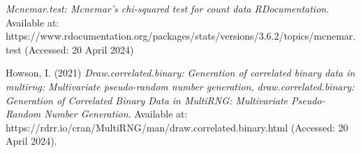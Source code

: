 \documentclass[12pt, letterpaper]{article}
\theoremstyle{definition}
\numberwithin{equation}{section}
\newcommand{\+}[1]{+_{\scalebox{.375}{#1}}}
\newcommand{\1}{\mathbbm{1}}
\begin{document}
\newpage\label{section.references}
\begin{thebibliography}{100}
	 \textit{Mcnemar.test: Mcnemar’s chi-squared test for count data RDocumentation}. Available at: https://www.rdocumentation.org/packages/stats/versions/3.6.2/topics/mcnemar.test (Accessed: 20 April 2024)
	
	 Howson, I. (2021) \textit{Draw.correlated.binary: Generation of correlated binary data in multirng: Multivariate pseudo-random number generation, draw.correlated.binary: Generation of Correlated Binary Data in MultiRNG: Multivariate Pseudo-Random Number Generation}. Available at: https://rdrr.io/cran/MultiRNG/man/draw.correlated.binary.html (Accessed: 20 April 2024). 
\end{thebibliography}
\end{document}

